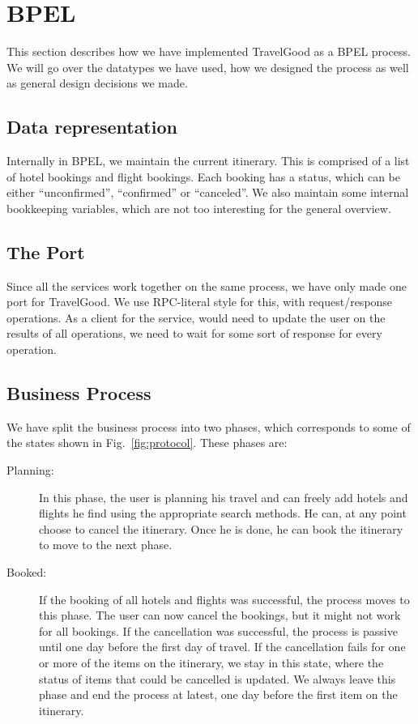 \section{BPEL}
This section describes how we have implemented TravelGood as a BPEL process. We will go over the datatypes we have used, how we designed the process as well as general design decisions we made.

\subsection{Data representation}
Internally in BPEL, we maintain the current itinerary. This is comprised of a list of hotel bookings and flight bookings. Each booking has a status, which can be either ``unconfirmed'', ``confirmed'' or ``canceled''. We also maintain some internal bookkeeping variables, which are not too interesting for the general overview.

\subsection{The Port}
Since all the services work together on the same process, we have only made one port for TravelGood. We use RPC-literal style for this, with request/response operations. As a client for the service, would need to update the user on the results of all operations, we need to wait for some sort of response for every operation.

\subsection{Business Process}
We have split the business process into two phases, which corresponds to some of the states shown in Fig.~\ref{fig:protocol}. These phases are:

\begin{description}
\item [Planning:] In this phase, the user is planning his travel and can freely add hotels and flights he find using the appropriate search methods. He can, at any point choose to cancel the itinerary. Once he is done, he can book the itinerary to move to the next phase.

\item[Booked:] If the booking of all hotels and flights was successful, the process moves to this phase. The user can now cancel the bookings, but it might not work for all bookings. If the cancellation was successful, the process is passive until one day before the first day of travel. If the cancellation fails for one or more of the items on the itinerary, we stay in this state, where the status of items that could be cancelled is updated. We always leave this phase and end the process at latest, one day before the first item on the itinerary.

\end{description}


